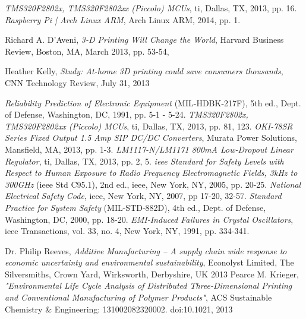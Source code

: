 \begin{thebibliography}{9}
	\textit{TMS320F2802x, TMS320F2802xx (Piccolo) MCUs},
	\gls{ti}, Dallas, TX,
	2013, pp. 16.
	\textit{Raspberry Pi | Arch Linux ARM},
	Arch Linux ARM,
	2014, pp. 1.

	Richard A. D'Aveni,
	\textit{3-D Printing Will Change the World},
	Harvard Business Review, Boston, MA,
	March 2013, pp. 53-54,

	Heather Kelly,
	\textit{Study: At-home 3D printing could save consumers thousands},
	CNN Technology Review,
	July 31, 2013

	\textit{Reliability Prediction of Electronic Equipment} (MIL-HDBK-217F), 5th ed.,
	Dept. of Defense, Washington, DC,
	1991, pp. 5-1 - 5-24.
	\textit{TMS320F2802x, TMS320F2802xx (Piccolo) MCUs},
	\gls{ti}, Dallas, TX,
	2013, pp. 81, 123.
	\textit{OKI-78SR Series Fixed Output 1.5 Amp SIP DC/DC Converters},
	Murata Power Solutions, Mansfield, MA,
	2013, pp. 1-3.
	\textit{LM1117-N/LM1171 800mA Low-Dropout Linear Regulator},
	\gls{ti}, Dallas, TX,
	2013, pp. 2, 5.
	\textit{\gls{ieee} Standard for Safety Levels with Respect to Human Exposure to Radio Frequency Electromagnetic Fields, 3kHz to 300GHz} (\gls{ieee} Std C95.1), 2nd ed.,
	\gls{ieee}, New York, NY,
	2005, pp. 20-25.
	\textit{National Electrical Safety Code},
	\gls{ieee}, New York, NY,
	2007, pp 17-20, 32-57.
	\textit{Standard Practice for System Safety} (MIL-STD-882D), 4th ed.,
	Dept. of Defense, Washington, DC,
	2000, pp. 18-20.
	\textit{EMI-Induced Failures in Crystal Oscillators},
	\gls{ieee} Transactions, vol. 33, no. 4, New York, NY,
	1991, pp. 334-341.

	Dr. Philip Reeves,
	\textit{Additive Manufacturing – A supply chain wide response to economic uncertainty and environmental sustainability},
	Econolyst Limited, The Silversmiths, Crown Yard, Wirksworth, Derbyshire, UK
	2013
	Pearce M. Krieger,
	\textit{"Environmental Life Cycle Analysis of Distributed Three-Dimensional Printing and Conventional Manufacturing of Polymer Products"},
	ACS Sustainable Chemistry \& Engineering: 131002082320002. doi:10.1021,
	2013	
\end{thebibliography}